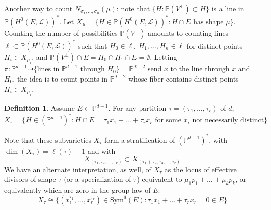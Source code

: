 \documentclass[thesis]{thesis-umich}           %
\renewcommand{\P}{\mathbb P}
\theoremstyle{definition}
\newtheorem{dfn}[thm]{Definition}
\begin{document}
Another way to count $N_{\sigma_1,\dots,\sigma_n}(\mu)$: note that $\{H:\P(V^{\perp})\subset H\}$ is a line in $\P(H^0(E,\mathcal L))^*$.
Let $X_{\mu}=\{H\in\P(H^0(E,\mathcal L))^*:H\cap E\text{ has shape }\mu\}$.
Counting the number of possibilities $\P(V^{\perp})$ amounts to counting lines $\ell\subset\P(H^0(E,\mathcal L))^*$ such that $H_0\in\ell$, $H_1,\dots,H_{n}\in\ell$ for distinct points $H_i\in X_{\mu_i}$, and $\P(V^{\perp})\cap E=H_0\cap H_1\cap E=\emptyset$.
Letting $\pi:\P^{d-1}\dashrightarrow \{\text{lines in $\P^{d-1}$ through $H_0$}\}=\P^{d-2}$ send $x$ to the line through $x$ and $H_0$, the idea is to count points in $\P^{d-2}$ whose fiber contains distinct points $H_i\in X_{\mu_i}$.

\begin{dfn}
  Assume $E\subset \P^{d-1}$. For any partition $\tau=(\tau_1,\dots,\tau_r)$ of $d$,
  \[
  X_{\tau}=\{H\in (\P^{d-1})^*:H\cap E=\tau_1x_1+\dots+\tau_rx_r\text{ for some }x_i\text{ not necessarily distinct}\}
  \]
\end{dfn}

Note that these subvarieties $X_{\tau}$ form a stratification of $(\P^{d-1})^*$,
with $\dim(X_{\tau})=\ell(\tau)-1$ and with
\[
X_{(\tau_1,\tau_2,\dots,\tau_r)}\subset X_{(\tau_1+\tau_2,\tau_3,\dots,\tau_r)}
\]
We have an alternate interpretation, as well, of $X_{\tau}$ as the locus of effective divisors of shape $\tau$ (or a specialization of $\tau$) equivalent to $\mu_1p_1+\dots+\mu_kp_k$, or equivalently which are zero in the group law of $E$:
\[
X_{\tau}\cong\{(x_1^{\tau_1},\dots,x_r^{\tau_r})\in\text{Sym}^d(E):\tau_1x_1+\dots+\tau_rx_r=0\in E\}
\]
\end{document}
